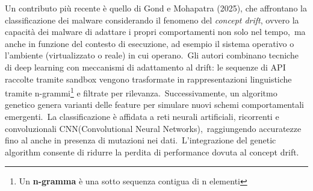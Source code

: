 Un contributo più recente è quello di Gond e Mohapatra (2025), che affrontano la classificazione dei
malware considerando il fenomeno del \textit{concept drift}, ovvero la capacità dei malware di adattare i propri comportamenti non solo nel tempo,\
ma anche in funzione del contesto di esecuzione, ad esempio il sistema operativo o l'ambiente (virtualizzato o reale) in cui operano.\
Gli autori combinano tecniche di deep learning con meccanismi di adattamento al drift:
le sequenze di API raccolte tramite sandbox vengono trasformate in rappresentazioni linguistiche
tramite n-grammi\footnote{Un \textbf{n-gramma} è una sotto sequenza contigua di n elementi} e filtrate per rilevanza.\
Successivamente, un algoritmo genetico genera varianti delle feature per simulare nuovi schemi comportamentali emergenti.\
La classificazione è affidata a reti neurali artificiali, ricorrenti e convoluzionali CNN(Convolutional Neural Networks),\
raggiungendo accuratezze fino al  anche in presenza di mutazioni nei dati.\
L'integrazione del genetic algorithm consente di ridurre la perdita di performance dovuta al concept drift.

